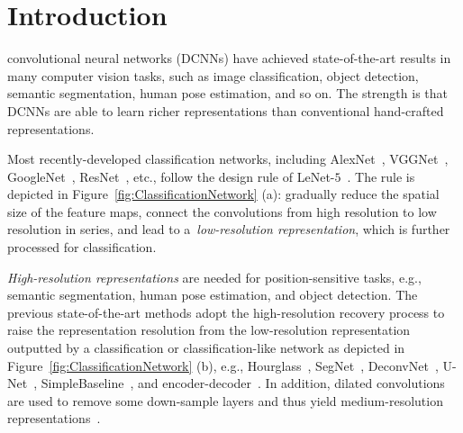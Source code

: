 \documentclass[10pt,journal,compsoc]{IEEEtran}
\begin{document}
\maketitle


\IEEEdisplaynontitleabstractindextext


\IEEEpeerreviewmaketitle


\ifCLASSOPTIONcompsoc
{}
\else
\section{Introduction}
\label{sec:introduction}
\fi




 convolutional neural networks (DCNNs)
have achieved state-of-the-art results in many computer vision tasks,
such as image classification,
object detection,
semantic segmentation,
human pose estimation, and so on.
The strength
is that DCNNs are able to learn richer representations
than conventional hand-crafted representations.

Most recently-developed classification networks,
including AlexNet~\cite{KrizhevskySH12}, VGGNet~\cite{SimonyanZ14a}, GoogleNet~\cite{SzegedyLJSRAEVR15}, ResNet~\cite{HeZRS16}, 
etc.,
follow the design rule of LeNet-$5$~\cite{Lecun98}.
The rule is depicted in Figure~\ref{fig:ClassificationNetwork} (a):
gradually reduce the spatial size of the feature maps,
connect the convolutions from high resolution
to low resolution in series,
and lead to a~\emph{low-resolution representation},
which is further processed for classification.


\emph{High-resolution representations}
are needed for position-sensitive tasks,
e.g., semantic segmentation, human pose estimation,
and object detection.
The previous state-of-the-art methods 
adopt the high-resolution recovery process
to raise the representation resolution from 
the low-resolution representation outputted by a classification or classification-like network
as depicted in Figure~\ref{fig:ClassificationNetwork} (b),
e.g., Hourglass~\cite{NewellYD16},
SegNet~\cite{BadrinarayananK17}, 
DeconvNet~\cite{NohHH15},
U-Net~\cite{RonebergerFB15},
SimpleBaseline~\cite{XiaoWW18},
and encoder-decoder~\cite{PengFWM16}.
In addition, dilated convolutions
are used to remove some down-sample layers
and thus yield medium-resolution representations~\cite{ChenPKMY18,ZhaoSQWJ17}.
\end{document}
